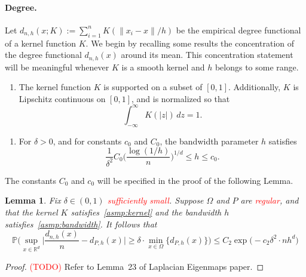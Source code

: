 \documentclass{article}
\newcommand{\Reals}{\mathbb{R}}
\newcommand{\1}{\mathbf{1}}
\newcommand{\Rd}{\Reals^d}
\newcommand{\Pbb}{\mathbb{P}}
\theoremstyle{alden}
\theoremstyle{aldenthm}
\newtheorem{lemma}{Lemma}
\theoremstyle{definition}
\theoremstyle{remark}
\begin{document}
\paragraph{Degree.}
Let $d_{n,h}(x;K) := \sum_{i = 1}^{n} K(\|x_i - x\|/h)$ be the empirical degree functional of a kernel function $K$. We begin by recalling some results the concentration of the degree functional $d_{n,h}(x)$ around its mean. This concentration statement will be meaningful whenever $K$ is a smooth kernel and $h$ belongs to some range.
\begin{enumerate}[label=(K\arabic*)]
	\setcounter{enumi}{0}
	\item
	\label{asmp:kernel}
	The kernel function $K$ is supported on a subset of $[0,1]$. Additionally, $K$ is Lipschitz continuous on $[0,1]$, and is normalized so that
	\begin{equation*}
	\int_{-\infty}^{\infty} K(|z|) \,dz = 1.
	\end{equation*}
\end{enumerate}
\begin{enumerate}[label=(P\arabic*)]
	\setcounter{enumi}{0}
	\item
	\label{asmp:bandwidth}
	For $\delta > 0$, and for constants $c_0$ and $C_0$, the bandwidth parameter $h$ satisfies
	\begin{equation*}
	\frac{1}{\delta^2}C_0\biggl(\frac{\log(1/h)}{n}\biggr)^{1/d} \leq h \leq c_0.
	\end{equation*}
\end{enumerate}
The constants $C_0$ and $c_0$ will be specified in the proof of the following Lemma.
\begin{lemma}
	\label{lem:max_degree_deviation}
	Fix $\delta \in (0,1)$ \textcolor{red}{sufficiently small}. Suppose $\Omega$ and $P$ are \textcolor{red}{regular}, and that the kernel $K$ satisfies~\ref{asmp:kernel} and the bandwidth $h$ satisfies~\ref{asmp:bandwidth}. It follows that
	\begin{equation*}
	\Pbb\Biggl( \sup_{x \in \Rd} \biggl|\frac{d_{n,h}(x)}{n} - d_{P,h}(x)\biggr| \geq \delta \cdot \min_{x \in \Omega}\bigl\{d_{P,h}(x)\bigr\} \Biggr) \leq C_2\exp\bigl(-c_2 \delta^2 \cdot n h^d\bigr)
	\end{equation*}
\end{lemma}
\begin{proof}
	\textcolor{red}{(TODO)} Refer to Lemma~23 of Laplacian Eigenmaps paper. 
\end{proof}
\end{document}
